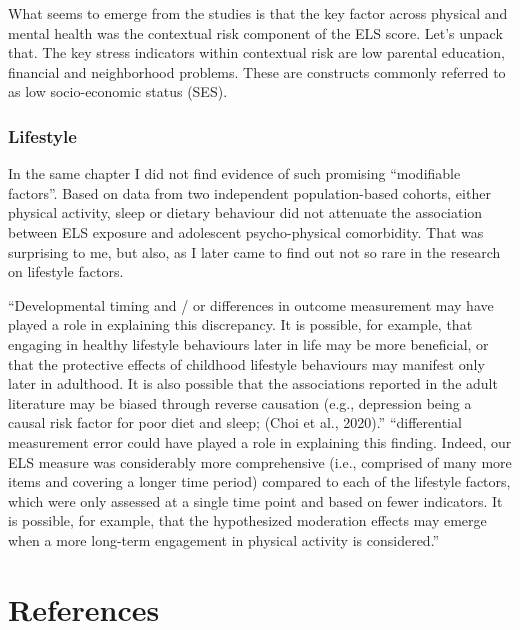 \documentclass[
  letterpaper,
  DIV=11,
  numbers=noendperiod]{scrreport}
\begin{document}
What seems to emerge from the studies is that the key factor across
physical and mental health was the contextual risk component of the ELS
score. Let's unpack that. The key stress indicators within contextual
risk are low parental education, financial and neighborhood problems.
These are constructs commonly referred to as low socio-economic status
(SES).

\subsubsection{Lifestyle}\label{lifestyle}

In the same chapter I did not find evidence of such promising
``modifiable factors''. Based on data from two independent
population-based cohorts, either physical activity, sleep or dietary
behaviour did not attenuate the association between ELS exposure and
adolescent psycho-physical comorbidity. That was surprising to me, but
also, as I later came to find out not so rare in the research on
lifestyle factors.

``Developmental timing and / or differences in outcome measurement may
have played a role in explaining this discrepancy. It is possible, for
example, that engaging in healthy lifestyle behaviours later in life may
be more beneficial, or that the protective effects of childhood
lifestyle behaviours may manifest only later in adulthood. It is also
possible that the associations reported in the adult literature may be
biased through reverse causation (e.g., depression being a causal risk
factor for poor diet and sleep; (Choi et al., 2020).'' ``differential
measurement error could have played a role in explaining this finding.
Indeed, our ELS measure was considerably more comprehensive (i.e.,
comprised of many more items and covering a longer time period) compared
to each of the lifestyle factors, which were only assessed at a single
time point and based on fewer indicators. It is possible, for example,
that the hypothesized moderation effects may emerge when a more
long-term engagement in physical activity is considered.''

\section*{References}\label{references-7}

\end{document}
